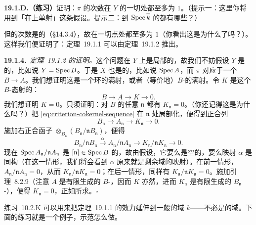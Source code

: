 \textbf{19.1.D.（练习）}\quad 证明：$\pi$ 的次数在 $Y$ 的一切\trClosedPoint{}处都至多为 $1$。（提示一：这里你将用到「在\trTangentVector{}上单射」这条假设。提示二：到 $\operatorname{Spec}\overline{k}$ 的\trFinite\trMorphism{}都有哪些？）

但\trFinite\trMorphism{}的次数是\trUpperSemicontinuous{}的（\S14.3.4），故在一切点处都至多为 $1$（你看出这是为什么了吗？）。这样我们便证明了：\mbox{定理~19.1.1} 可以由\mbox{定理~19.1.2} 推出。

\textbf{19.1.4.}\ \emph{\mbox{定理~19.1.2} 的证明。}\quad 这个问题在 $Y$ 上是局部的，故我们不妨假设 $Y$ 是\trAffine{}的，比如说 $Y=\operatorname{Spec} B$。于是 $X$ 也是\trAffine{}的，比如说 $\operatorname{Spec} A$，而 $\pi$ 对应于一个\trRingMorphism{} $B\to A$。我们想证明这是一个环的满射，或者（等价地）$B$-\trModule{}的满射。令 $K$ 是这个 $B$-\trModule{}态射的\trCokernel：
\begin{equation*}\tag{19.1.4.1}\label{eq:criterion-cokernel-sequence}
B\longrightarrow A\longrightarrow K\longrightarrow 0.
\end{equation*}
我们想证明 $K=0$。只须证明：对 $B$ 的任意\trMaximalIdeal{} $\mathfrak{n}$ 都有 $K_{\mathfrak{n}}=0$。（你还记得这是为什么吗？）把 \eqref{eq:criterion-cokernel-sequence} 在 $\mathfrak{n}$ 处局部化，便得到正合列
\[
B_{\mathfrak{n}}\longrightarrow A_{\mathfrak{n}}\longrightarrow K_{\mathfrak{n}}\longrightarrow 0.
\]
施加右正合函子 $\otimes_{B_{\mathfrak{n}}}(B_{\mathfrak{n}}/\mathfrak{n}B_{\mathfrak{n}})$，便得
\begin{equation*}\tag{19.1.4.2}\label{eq:criterion-tensor-cokernel-sequence}
B_{\mathfrak{n}}/\mathfrak{n}B_{\mathfrak{n}}\overset{\alpha}{\longrightarrow}A_{\mathfrak{n}}/\mathfrak{n}A_{\mathfrak{n}}\longrightarrow K_{\mathfrak{n}}/\mathfrak{n}K_{\mathfrak{n}}\longrightarrow 0.
\end{equation*}
现在 $\operatorname{Spec} A_{\mathfrak{n}}/\mathfrak{n}A_{\mathfrak{n}}$ 是 $[\mathfrak{n}]\in\operatorname{Spec} B$ 的\trSchemeTheoreticPreimage，故由假设，它要么是空的，要么映射 $\alpha$ 是同构（在这一情形，我们将会看到 $\alpha$ 原来就是剩余域的映射）。在前一情形，$A_{\mathfrak{n}}/\mathfrak{n}A_{\mathfrak{n}}=0$，从而 $K_{\mathfrak{n}}/\mathfrak{n}K_{\mathfrak{n}}=0$；在后一情形，同样有 $K_{\mathfrak{n}}/\mathfrak{n}K_{\mathfrak{n}}=0$。施加\trNakayama{}引理~8.2.9（注意 $A$ 是有限生成的 $B$-\trModule，因而 $K$ 亦然，进而 $K_{\mathfrak{n}}$ 是有限生成的 $B_{\mathfrak{n}}$-\trModule），便得 $K_{\mathfrak{n}}=0$，正如所求。\hfill$\square$

\mbox{练习~10.2.K} 可以用来把\mbox{定理~19.1.1} 的效力延伸到一般的域 $k$——不必是\trAlgClosed{}的域。下面的练习就是一个例子，示范怎么做。

